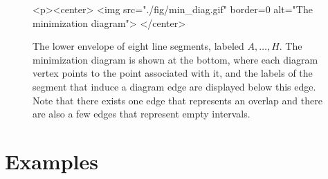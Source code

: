 \begin{figure}[t]
\begin{ccTexOnly}
  \begin{center}
  \end{center}
\end{ccTexOnly}
\begin{ccHtmlOnly}
  <p><center>
  <img src="./fig/min_diag.gif" border=0 alt="The minimization diagram">
  </center>
\end{ccHtmlOnly}
\caption{The lower envelope of eight line segments, labeled
$A, \ldots, H$. The minimization diagram is shown at the bottom, where
each diagram vertex points to the point associated with it, and the
labels of the segment that induce a diagram edge are displayed below
this edge. Note that there exists one edge that represents an overlap
and there are also a few edges that represent empty
intervals.\label{env2_fig:min_diag}}
\end{figure}

\section{Examples}

